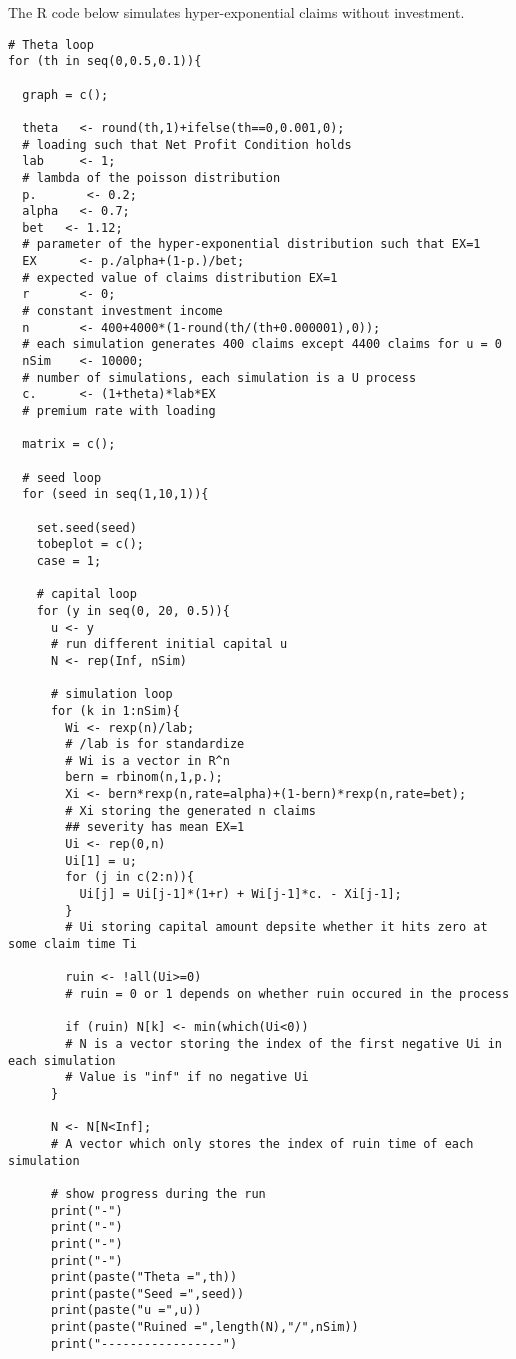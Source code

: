 \documentclass[12pt]{article}
\begin{document}
\newpage
The R code below simulates hyper-exponential claims without investment.
\begin{lstlisting}
# Theta loop
for (th in seq(0,0.5,0.1)){
  
  graph = c();
  
  theta   <- round(th,1)+ifelse(th==0,0.001,0);      
  # loading such that Net Profit Condition holds
  lab     <- 1;                
  # lambda of the poisson distribution
  p.       <- 0.2;
  alpha   <- 0.7;
  bet   <- 1.12;
  # parameter of the hyper-exponential distribution such that EX=1
  EX      <- p./alpha+(1-p.)/bet;
  # expected value of claims distribution EX=1
  r       <- 0;
  # constant investment income
  n       <- 400+4000*(1-round(th/(th+0.000001),0));
  # each simulation generates 400 claims except 4400 claims for u = 0
  nSim    <- 10000;            
  # number of simulations, each simulation is a U process
  c.      <- (1+theta)*lab*EX  
  # premium rate with loading
  
  matrix = c();
  
  # seed loop
  for (seed in seq(1,10,1)){
    
    set.seed(seed)
    tobeplot = c();
    case = 1;
    
    # capital loop
    for (y in seq(0, 20, 0.5)){
      u <- y
      # run different initial capital u
      N <- rep(Inf, nSim)
      
      # simulation loop
      for (k in 1:nSim){
        Wi <- rexp(n)/lab; 
        # /lab is for standardize
        # Wi is a vector in R^n
        bern = rbinom(n,1,p.);
        Xi <- bern*rexp(n,rate=alpha)+(1-bern)*rexp(n,rate=bet);
        # Xi storing the generated n claims
        ## severity has mean EX=1
        Ui <- rep(0,n)
        Ui[1] = u;
        for (j in c(2:n)){
          Ui[j] = Ui[j-1]*(1+r) + Wi[j-1]*c. - Xi[j-1];
        }
        # Ui storing capital amount depsite whether it hits zero at some claim time Ti
        
        ruin <- !all(Ui>=0)
        # ruin = 0 or 1 depends on whether ruin occured in the process
        
        if (ruin) N[k] <- min(which(Ui<0))
        # N is a vector storing the index of the first negative Ui in each simulation
        # Value is "inf" if no negative Ui
      }
      
      N <- N[N<Inf]; 
      # A vector which only stores the index of ruin time of each simulation 
      
      # show progress during the run
      print("-")
      print("-")
      print("-")
      print("-")
      print(paste("Theta =",th))
      print(paste("Seed =",seed))
      print(paste("u =",u))
      print(paste("Ruined =",length(N),"/",nSim))
      print("-----------------")
      

\end{lstlisting}
\end{document}
